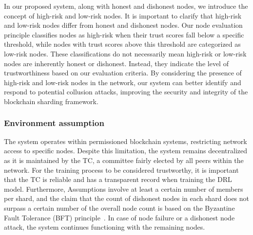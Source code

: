 In our proposed system, along with honest and dishonest nodes, we introduce the concept of high-risk and low-risk nodes. It is important to clarify that high-risk and low-risk nodes differ from honest and dishonest nodes. Our node evaluation principle classifies nodes as high-risk when their trust scores fall below a specific threshold, while nodes with trust scores above this threshold are categorized as low-risk nodes. These classifications do not necessarily mean high-risk or low-risk nodes are inherently honest or dishonest. Instead, they indicate the level of trustworthiness based on our evaluation criteria. By considering the presence of high-risk and low-risk nodes in the network, our system can better identify and respond to potential collusion attacks, improving the security and integrity of the blockchain sharding framework.


\subsubsection{Environment assumption}

The system operates within permissioned blockchain systems, restricting network access to specific nodes. Despite this limitation, the system remains decentralized as it is maintained by the TC, a committee fairly elected by all peers within the network. For the training process to be considered trustworthy, it is important that the TC is reliable and has a transparent record when training the DRL model. Furthermore, Assumptions involve at least a certain number of members per shard, and the claim that the count of dishonest nodes in each shard does not surpass a certain number of the overall node count is based on the Byzantine Fault Tolerance (BFT) principle~\cite{clement2009making}. In case of node failure or a dishonest node attack, the system continues functioning with the remaining nodes.
